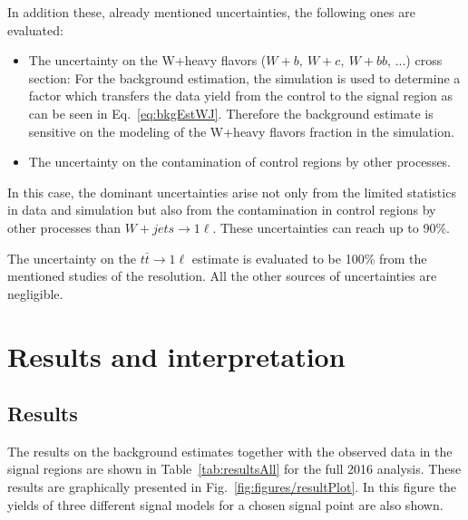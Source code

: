 In addition these, already mentioned uncertainties, the following ones are evaluated:
\begin{itemize} 
\item The uncertainty on the W+heavy flavors ($W+b,~W+c,~W+bb$, ...) cross section: For the background estimation, the simulation is used to determine a factor which transfers the data yield from the control to the signal region as can be seen in Eq.~\ref{eq:bkgEstWJ}. Therefore the background estimate is sensitive on the modeling of the W+heavy flavors fraction in the simulation.
\item The uncertainty on the contamination of control regions by other processes.
\end{itemize}

In this case, the dominant uncertainties arise not only from the limited statistics in data and simulation but also from the contamination in  control regions by other  processes than $W+jets \to 1\ell$. These uncertainties can reach up to 90\%.

The uncertainty on the $t\bar{t} \to 1\ell$ estimate is evaluated to be 100\% from the mentioned studies of the \MET resolution. All the other sources of uncertainties are negligible.



\section{Results and interpretation~\label{sec:results}}

\subsection{Results}

The results on the background estimates together with the observed data in the signal regions are shown in Table~\ref{tab:resultsAll} for the full 2016 analysis. These results are graphically presented in Fig.~\ref{fig:figures/resultPlot}. In this figure the yields of three different signal models for a chosen signal point are also shown. 

